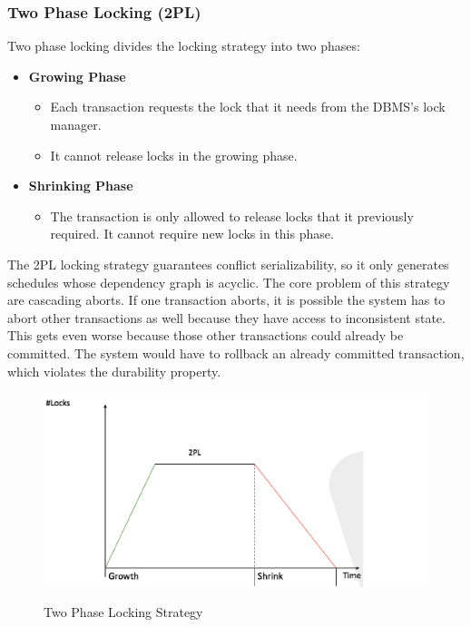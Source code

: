 \subsubsection{Two Phase Locking (2PL)}
Two phase locking divides the locking strategy into two phases:
\begin{itemize}
\item \textbf{Growing Phase}
\begin{itemize}
\item Each transaction requests the lock that it needs from the DBMS's lock manager.
\item It cannot release locks in the growing phase.
\end{itemize}
\item \textbf{Shrinking Phase}
\begin{itemize}
\item The transaction is only allowed to release locks that it previously required. It cannot require new locks in this phase.
\end{itemize}
\end{itemize}
The 2PL locking strategy guarantees conflict serializability, so it only generates schedules whose dependency graph is acyclic. The core problem of this strategy are cascading aborts. If one transaction aborts, it is possible the system has to abort other transactions as well because they have access to inconsistent state. This gets even worse because those other transactions could already be committed. The system would have to rollback an already committed transaction, which violates the durability property.
\begin{figure}[H]
\centering
\includegraphics[width=.5\textwidth]{images/2pl.PNG}
\label{2pl}
\caption{Two Phase Locking Strategy}
\end{figure}

